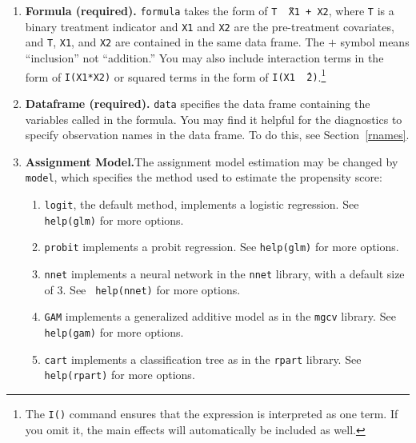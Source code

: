 \documentclass[oneside,letterpaper,titlepage]{article}
\begin{document}
\begin{enumerate}

\item \textbf{Formula (required).}  \texttt{formula}  takes the form of {\tt T \~\ X1 + X2}, where
  {\tt T} is a binary treatment indicator and {\tt X1} and {\tt X2} are
  the pre-treatment covariates, and {\tt T}, {\tt X1}, and {\tt X2}
  are contained in the same data frame.  The $+$ symbol means
  ``inclusion'' not ``addition.'' You may also include
  interaction terms in the form of {\tt I(X1*X2)} or squared terms in
  the form of {\tt I(X1 \^\ 2)}.\footnote{The \texttt{I()} command
  ensures that the expression is interpreted as one term.  If you omit
  it, the main effects will automatically be included as well.} 
  
\item \textbf{Dataframe (required).}  \texttt{data} specifies the data frame containing the
  variables called in the formula.  You may find it helpful for the
  diagnostics to specify observation names in the data frame.  To do
  this, see Section~\ref{rnames}.

\item \textbf{Assignment Model.}The assignment model estimation may be
  changed by \texttt{model}, which specifies the method used to estimate the propensity score:
  \begin{enumerate}
  \item \texttt{logit}, the default method, implements a logistic regression.  See
    {\tt help(glm)} for more options. 
  \item \texttt{probit} implements a probit regression.  See
    {\tt help(glm)} for more options. 
  \item \texttt{nnet} implements a neural network in the
    \texttt{nnet} library, with a default size of 3.  See {\tt
      help(nnet)} for more options.
  \item \texttt{GAM} implements a generalized additive model 
    as in the \texttt{mgcv} library.  See
    {\tt help(gam)} for more options.
  \item \texttt{cart} implements a classification tree as in the
    \texttt{rpart} library.  See {\tt help(rpart)} for more
    options.  
  \end{enumerate}


\end{enumerate}
\end{document}
